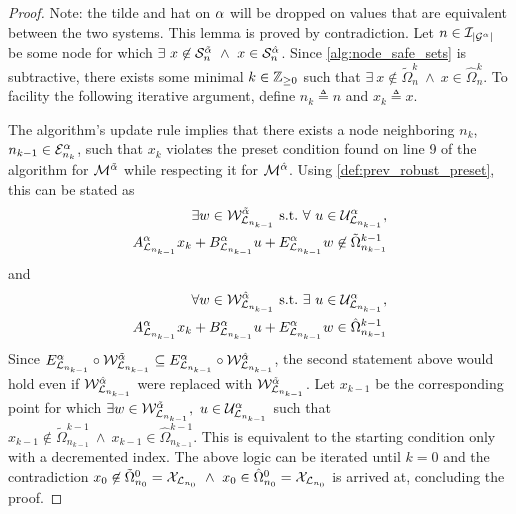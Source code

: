 \begin{proof}
Note: the tilde and hat on $\alpha$ will be dropped on values that are equivalent between the two systems. This lemma is proved by contradiction. Let $n\in\idxset{\gnumnodes[\agentidx]}$ be some node for which $\exists\ x\not\in\mathcal{S}_n^{\tilde{\agentidx}}\ \land\ x\in\mathcal{S}_n^{\hat{\agentidx}}$. Since \autoref{alg:node_safe_sets} is subtractive, there exists some minimal $k\in\mathbb{Z}_{\geq 0}$ such that $\exists\ x\not\in\tilde\Omega^k_{n}\ \land\ x\in\hat\Omega^k_{n}$. To facility the following iterative argument, define $n_k\triangleq n$ and $x_k\triangleq x$.

The algorithm's update rule implies that there exists a node neighboring $n_k$, $n_{k-1}\in\gnodeedges[\agentidx]{n_k}$, such that $x_k$ violates the preset condition found on line 9 of the algorithm for  $\mathcal{M}^{\tilde{\alpha}}$ while respecting it for  $\mathcal{M}^{\hat{\alpha}}$.  Using \autoref{def:prev_robust_preset}, this can be stated as
\begin{align*}
\exists w\in\wcon[{\gnodelabel{n_{k-1}}}]^{\tilde{\agentidx}}\ \st\ \forall\ u\in\ucon[{\gnodelabel{n_{k-1}}}]^\agentidx,\\ 
A_{\gnodelabel{n_{k-1}}}^\agentidx x_k+B_{\gnodelabel{n_{k-1}}}^\agentidx u + E_{\gnodelabel{n_{k-1}}}^\agentidx w \not\in \tilde\Omega^{k-1}_{{{n_{k-1}}}}
\end{align*}
and
\begin{align*}
\forall w\in\wcon[{\gnodelabel{n_{k-1}}}]^{\hat{\agentidx}}\ \st\ \exists\ u\in\ucon[{\gnodelabel{n_{k-1}}}]^\agentidx,\\ 
A_{\gnodelabel{n_{k-1}}}^\agentidx x_k+B_{\gnodelabel{n_{k-1}}}^\agentidx u + E_{\gnodelabel{n_{k-1}}}^\agentidx w \in \hat\Omega^{k-1}_{{{n_{k-1}}}}
\end{align*}
Since $E_{\mathcal{L}_{n_{k-1}}}^{\alpha}\circ\mathcal{W}^{\tilde{\alpha}}_{\mathcal{L}_{n_{k-1}}}\subseteq E_{\mathcal{L}_{n_{k-1}}}^{\alpha}\circ\mathcal{W}^{\hat{\alpha}}_{\mathcal{L}_{n_{k-1}}}$, the second statement above would hold even if $\wcon[{\gnodelabel{n_{k-1}}}]^{\hat{\agentidx}}$ were replaced with $\wcon[{\gnodelabel{n_{k-1}}}]^{\tilde{\agentidx}}$. Let $x_{k-1}$ be the corresponding point for which $\exists w\in\wcon[{\gnodelabel{n_{k-1}}}]^{\tilde{\agentidx}},\ u\in\ucon[{\gnodelabel{n_{k-1}}}]^\agentidx$ such that $x_{k-1}\not\in\tilde\Omega^{k-1}_{n_{k-1}}\ \land\ x_{k-1}\in\hat\Omega^{k-1}_{n_{k-1}}$. This is equivalent to the starting condition only with a decremented index. The above logic can be iterated until $k=0$ and the contradiction $x_0\not\in\tilde\Omega^{0}_{n_0}=\xcon[\gnodelabel{n_0}]\ \land\ x_0\in\hat\Omega^{0}_{n_0}=\xcon[\gnodelabel{n_0}]$ is arrived at, concluding the proof. 
\end{proof}

